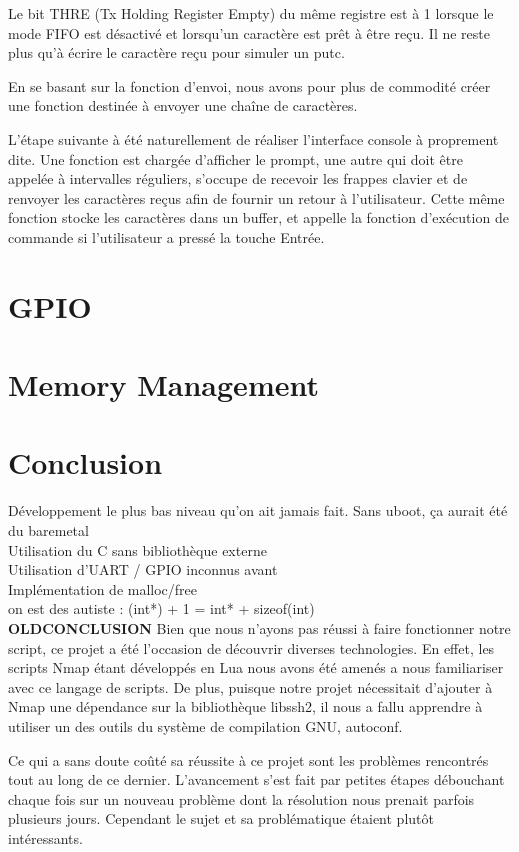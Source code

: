 \documentclass[frenchb]{article}
\begin{document}
 Le bit THRE (Tx Holding Register Empty) du même registre est à 1 lorsque le mode FIFO est désactivé et lorsqu'un caractère est prêt à être reçu. Il ne reste plus qu'à écrire le caractère reçu pour simuler un \textsf{putc}.

En se basant sur la fonction d'envoi, nous avons pour plus de commodité créer une fonction destinée à envoyer une chaîne de caractères.

L'étape suivante à été naturellement de réaliser l'interface console à proprement dite. Une fonction est chargée d'afficher le prompt, une autre qui doit être appelée à intervalles réguliers, s'occupe de recevoir les frappes clavier et de renvoyer les caractères reçus afin de fournir un retour à l'utilisateur. Cette même fonction stocke les caractères dans un buffer, et appelle la fonction d'exécution de commande si l'utilisateur a pressé la touche Entrée.


%
\section{GPIO}

\section{Memory Management}

\clearpage

\section*{Conclusion}

\noindent Développement le plus bas niveau qu'on ait jamais fait. Sans uboot, ça aurait été du baremetal\\
Utilisation du C sans bibliothèque externe\\
Utilisation d'UART / GPIO inconnus avant\\
Implémentation de malloc/free\\
on est des autiste : (int*) + 1 = int* + sizeof(int)\\


{\Large\textbf{OLDCONCLUSION}}
Bien que nous n'ayons pas réussi à faire fonctionner notre script, ce projet a été l'occasion de découvrir diverses technologies. En effet, les scripts Nmap étant développés en Lua nous avons été amenés a nous familiariser avec ce langage de scripts. De plus, puisque notre projet nécessitait d'ajouter à Nmap une dépendance sur la bibliothèque \textsf{libssh2}, il nous a fallu apprendre à utiliser un des outils du système de compilation GNU, \textsf{autoconf}. 

Ce qui a sans doute coûté sa réussite à ce projet sont les problèmes rencontrés tout au long de ce dernier. L'avancement s'est fait par petites étapes débouchant chaque fois sur un nouveau problème dont la résolution nous prenait parfois plusieurs jours. Cependant le sujet et sa problématique étaient plutôt intéressants.
\end{document}
